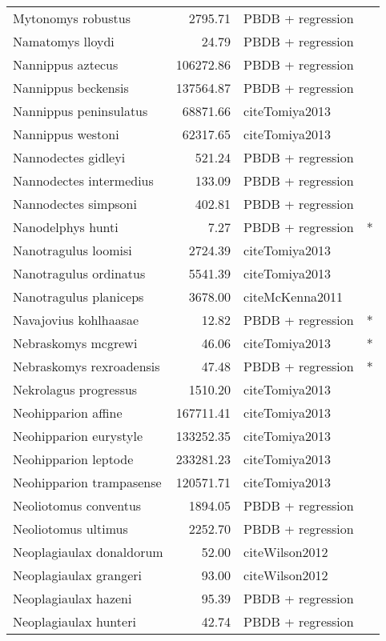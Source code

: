 \begin{table}[ht]
\begin{tabular}{lrll}
  Mytonomys robustus & 2795.71 & PBDB + regression &  \\ 
  Namatomys lloydi & 24.79 & PBDB + regression &  \\ 
  Nannippus aztecus & 106272.86 & PBDB + regression &  \\ 
  Nannippus beckensis & 137564.87 & PBDB + regression &  \\ 
  Nannippus peninsulatus & 68871.66 & cite{Tomiya2013} &  \\ 
  Nannippus westoni & 62317.65 & cite{Tomiya2013} &  \\ 
  Nannodectes gidleyi & 521.24 & PBDB + regression &  \\ 
  Nannodectes intermedius & 133.09 & PBDB + regression &  \\ 
  Nannodectes simpsoni & 402.81 & PBDB + regression &  \\ 
  Nanodelphys hunti & 7.27 & PBDB + regression & * \\ 
  Nanotragulus loomisi & 2724.39 & cite{Tomiya2013} &  \\ 
  Nanotragulus ordinatus & 5541.39 & cite{Tomiya2013} &  \\ 
  Nanotragulus planiceps & 3678.00 & cite{McKenna2011} &  \\ 
  Navajovius kohlhaasae & 12.82 & PBDB + regression & * \\ 
  Nebraskomys mcgrewi & 46.06 & cite{Tomiya2013} & * \\ 
  Nebraskomys rexroadensis & 47.48 & PBDB + regression & * \\ 
  Nekrolagus progressus & 1510.20 & cite{Tomiya2013} &  \\ 
  Neohipparion affine & 167711.41 & cite{Tomiya2013} &  \\ 
  Neohipparion eurystyle & 133252.35 & cite{Tomiya2013} &  \\ 
  Neohipparion leptode & 233281.23 & cite{Tomiya2013} &  \\ 
  Neohipparion trampasense & 120571.71 & cite{Tomiya2013} &  \\ 
  Neoliotomus conventus & 1894.05 & PBDB + regression &  \\ 
  Neoliotomus ultimus & 2252.70 & PBDB + regression &  \\ 
  Neoplagiaulax donaldorum & 52.00 & cite{Wilson2012} &  \\ 
  Neoplagiaulax grangeri & 93.00 & cite{Wilson2012} &  \\ 
  Neoplagiaulax hazeni & 95.39 & PBDB + regression &  \\ 
  Neoplagiaulax hunteri & 42.74 & PBDB + regression &  \\ 

\end{tabular}
\end{table}
